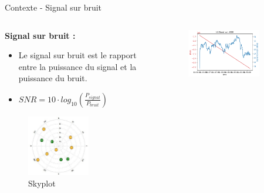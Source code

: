 \documentclass[xcolor=dvipsnames,envcountsect]{beamer}
\begin{document}
\begin{frame}{Contexte - Signal sur bruit}
	\begin{columns}
		\begin{column}{0.5\textwidth}
			\textbf{Signal sur bruit :} 
			\begin{itemize}
				\item Le signal sur bruit est le rapport entre la puissance du signal et la puissance du bruit.
				\item $SNR = 10 \cdot log_{10}(\frac{P_{signal}}{P_{bruit}})$
			\end{itemize}
			\begin{figure}
				\centering
				\includegraphics[width=0.6\textwidth]{./Figures/skyplot.jpg}
				\caption {Skyplot}
			\end{figure}
		\end{column}
		\begin{column}{0.5\textwidth}
			\begin{figure}
				\includegraphics[width=0.8\textwidth]{./Figures/G08_L1.png}

\end{figure}
\end{column}
\end{columns}
\end{frame}
\end{document}
